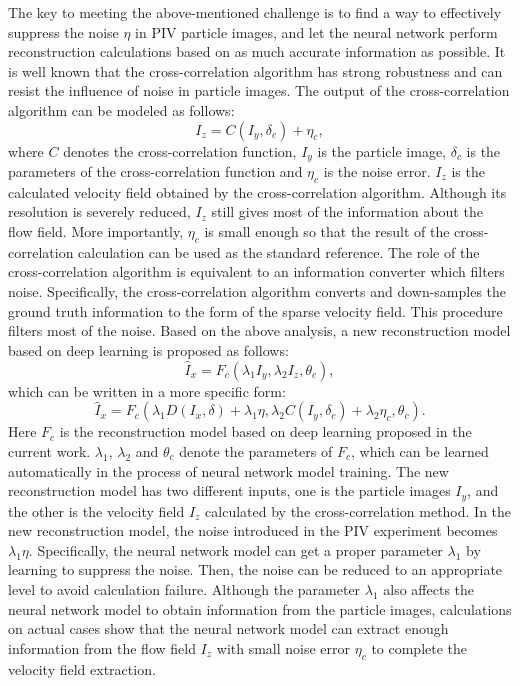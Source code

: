 \documentclass[%
 aip,
 amsmath,amssymb,
 reprint,%
]{revtex4-1}
\begin{document}
The key to meeting the above-mentioned challenge is to find a way to effectively suppress the noise $\eta$ in PIV particle images, and let the neural network perform reconstruction calculations based on as much accurate information as possible.
It is well known that the cross-correlation algorithm has strong robustness and can resist the influence of noise in particle images.
The output of the cross-correlation algorithm can be modeled as follows:
\begin{equation}
I_{z}=C(I_{y},\delta_{c})+\eta_{c},
\label{eqn3}
\end{equation}
where $C$ denotes the cross-correlation function, $I_{y}$ is the particle image, $\delta_{c}$ is the parameters of the cross-correlation function and $\eta_{c}$ is the noise error.
$I_{z}$ is the calculated velocity field obtained by the cross-correlation algorithm.
Although its resolution is severely reduced, $I_{z}$ still gives most of the information about the flow field. 
More importantly, $\eta_{c}$ is small enough so that the result of the cross-correlation calculation can be used as the standard reference. 
The role of the cross-correlation algorithm is equivalent to an information converter which filters noise. Specifically, the cross-correlation algorithm converts and down-samples the ground truth information to the form of the sparse velocity field. This procedure filters most of the noise.
Based on the above analysis, a new reconstruction model based on deep learning is proposed as follows:
\begin{equation}
\hat{I}_{x}=F_{c}(\lambda_{1}I_{y},\lambda_{2}I_{z},\theta_{c}),
\label{eqn4}
\end{equation}
which can be written in a more specific form:
\begin{equation}
\hat{I}_{x}=F_{c}(\lambda_{1}D(I_{x},\delta)+\lambda_{1}\eta,\lambda_{2}C(I_{y},\delta_{c})+\lambda_{2}\eta_{c},\theta_{c}).
\label{eqn5}
\end{equation}
Here $F_{c}$ is the reconstruction model based on deep learning proposed in the current work. 
$\lambda_{1}$, $\lambda_{2}$ and $\theta_{c}$ denote the parameters of $F_{c}$, which can be learned automatically in the process of neural network model training.
The new reconstruction model has two different inputs, one is the particle images $I_{y}$, and the other is the velocity field $I_{z}$ calculated by the cross-correlation method. 
In the new reconstruction model, the noise introduced in the PIV experiment becomes $\lambda_{1}\eta$.
Specifically, the neural network model can get a proper parameter $\lambda_{1}$ by learning to suppress the noise.
Then, the noise can be reduced to an appropriate level to avoid calculation failure. 
Although the parameter $\lambda_{1}$ also affects the neural network model to obtain information from the particle images, calculations on actual cases show that the neural network model can extract enough information from the flow field $I_{z}$ with small noise error $\eta_{c}$ to complete the velocity field extraction.
\end{document}
